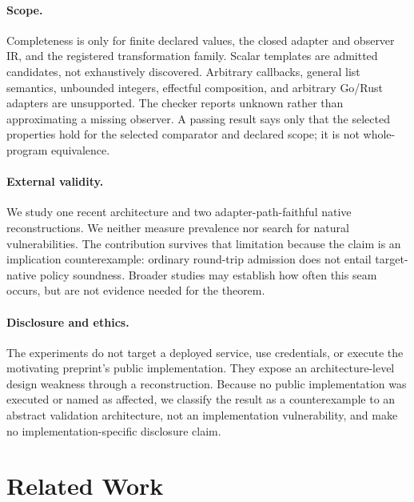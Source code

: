 \documentclass[sigconf,anonymous,review]{acmart}
\begin{document}
\paragraph{Scope.}
Completeness is only for finite declared values, the closed adapter and
observer IR, and the registered transformation family.  Scalar
templates are admitted candidates, not exhaustively discovered.
Arbitrary callbacks, general list semantics, unbounded integers,
effectful composition, and arbitrary Go/Rust adapters are unsupported.
The checker reports unknown rather than approximating a missing
observer.  A passing result says only that the selected properties hold
for the selected comparator and declared scope; it is not whole-program
equivalence.

\paragraph{External validity.}
We study one recent architecture and two adapter-path-faithful native
reconstructions.  We neither measure prevalence nor search for natural
vulnerabilities.  The contribution survives that limitation because
the claim is an implication counterexample: ordinary round-trip
admission does not entail target-native policy soundness.  Broader
studies may establish how often this seam occurs, but are not evidence
needed for the theorem.

\paragraph{Disclosure and ethics.}
The experiments do not target a deployed service, use credentials, or
execute the motivating preprint's public implementation.  They expose
an architecture-level design weakness through a reconstruction.  Because no
public implementation was executed or named as affected, we classify the
result as a counterexample to an abstract validation architecture, not an
implementation vulnerability, and make no implementation-specific disclosure
claim.

\section{Related Work}
\end{document}
